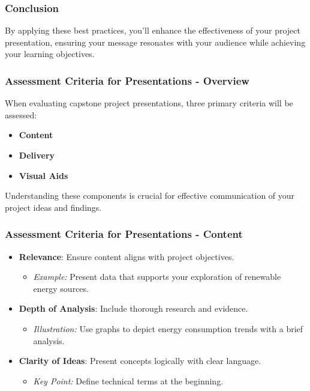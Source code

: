 \documentclass[aspectratio=169]{beamer}
\begin{document}
\begin{frame}[fragile]
    \frametitle{Conclusion}
    By applying these best practices, you'll enhance the effectiveness of your project presentation, ensuring your message resonates with your audience while achieving your learning objectives.
\end{frame}

\begin{frame}[fragile]
    \frametitle{Assessment Criteria for Presentations - Overview}
    When evaluating capstone project presentations, three primary criteria will be assessed:
    \begin{itemize}
        \item \textbf{Content}
        \item \textbf{Delivery}
        \item \textbf{Visual Aids}
    \end{itemize}
    Understanding these components is crucial for effective communication of your project ideas and findings.
\end{frame}

\begin{frame}[fragile]
    \frametitle{Assessment Criteria for Presentations - Content}
    \begin{itemize}
        \item \textbf{Relevance}: Ensure content aligns with project objectives.
            \begin{itemize}
                \item \textit{Example:} Present data that supports your exploration of renewable energy sources.
            \end{itemize}
        
        \item \textbf{Depth of Analysis}: Include thorough research and evidence.
            \begin{itemize}
                \item \textit{Illustration:} Use graphs to depict energy consumption trends with a brief analysis.
            \end{itemize}
        
        \item \textbf{Clarity of Ideas}: Present concepts logically with clear language.
            \begin{itemize}
                \item \textit{Key Point:} Define technical terms at the beginning.
            \end{itemize}
    \end{itemize}
\end{frame}
\end{document}
